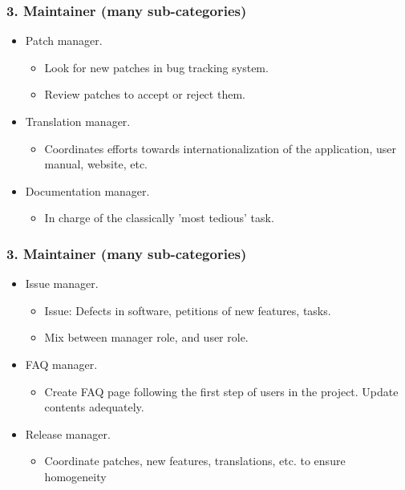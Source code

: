 \documentclass{beamer}
\begin{document}
\begin{frame}
 \frametitle{3. Maintainer (many sub-categories)}
  \begin{itemize}
   \item Patch manager.
   \begin{itemize}
    \item Look for new patches in bug tracking system.
    \item Review patches to accept or reject them.
   \end{itemize}

   \item Translation manager.
   \begin{itemize}
    \item Coordinates efforts towards internationalization 
    of the application, user manual, website, etc.
   \end{itemize}

   \item Documentation manager.
   \begin{itemize}
    \item In charge of the classically 'most tedious' task.
   \end{itemize}

  \end{itemize}

\end{frame}


\begin{frame}
 \frametitle{3. Maintainer (many sub-categories)}
  \begin{itemize}
   \item Issue manager.
    \begin{itemize}
    \item Issue: Defects in software, petitions of new features, tasks.
    \item Mix between manager role, and user role.
    \end{itemize}
   \item FAQ manager.
    \begin{itemize}
     \item Create FAQ page following the first step of users in the project. Update contents adequately.
    \end{itemize}
   \item Release manager.
    \begin{itemize}
     \item Coordinate patches, new features, translations, etc. to ensure homogeneity
    \end{itemize}

  \end{itemize}

\end{frame}
\end{document}
